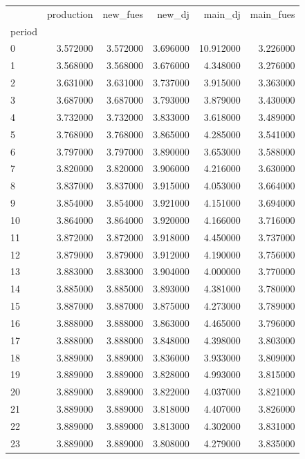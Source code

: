 \begin{tabular}{lrrrrr}
\toprule
 & production & new_fues & new_dj & main_dj & main_fues \\
period &  &  &  &  &  \\
\midrule
0 & 3.572000 & 3.572000 & 3.696000 & 10.912000 & 3.226000 \\
1 & 3.568000 & 3.568000 & 3.676000 & 4.348000 & 3.276000 \\
2 & 3.631000 & 3.631000 & 3.737000 & 3.915000 & 3.363000 \\
3 & 3.687000 & 3.687000 & 3.793000 & 3.879000 & 3.430000 \\
4 & 3.732000 & 3.732000 & 3.833000 & 3.618000 & 3.489000 \\
5 & 3.768000 & 3.768000 & 3.865000 & 4.285000 & 3.541000 \\
6 & 3.797000 & 3.797000 & 3.890000 & 3.653000 & 3.588000 \\
7 & 3.820000 & 3.820000 & 3.906000 & 4.216000 & 3.630000 \\
8 & 3.837000 & 3.837000 & 3.915000 & 4.053000 & 3.664000 \\
9 & 3.854000 & 3.854000 & 3.921000 & 4.151000 & 3.694000 \\
10 & 3.864000 & 3.864000 & 3.920000 & 4.166000 & 3.716000 \\
11 & 3.872000 & 3.872000 & 3.918000 & 4.450000 & 3.737000 \\
12 & 3.879000 & 3.879000 & 3.912000 & 4.190000 & 3.756000 \\
13 & 3.883000 & 3.883000 & 3.904000 & 4.000000 & 3.770000 \\
14 & 3.885000 & 3.885000 & 3.893000 & 4.381000 & 3.780000 \\
15 & 3.887000 & 3.887000 & 3.875000 & 4.273000 & 3.789000 \\
16 & 3.888000 & 3.888000 & 3.863000 & 4.465000 & 3.796000 \\
17 & 3.888000 & 3.888000 & 3.848000 & 4.398000 & 3.803000 \\
18 & 3.889000 & 3.889000 & 3.836000 & 3.933000 & 3.809000 \\
19 & 3.889000 & 3.889000 & 3.828000 & 4.993000 & 3.815000 \\
20 & 3.889000 & 3.889000 & 3.822000 & 4.037000 & 3.821000 \\
21 & 3.889000 & 3.889000 & 3.818000 & 4.407000 & 3.826000 \\
22 & 3.889000 & 3.889000 & 3.813000 & 4.302000 & 3.831000 \\
23 & 3.889000 & 3.889000 & 3.808000 & 4.279000 & 3.835000 \\

\end{tabular}
